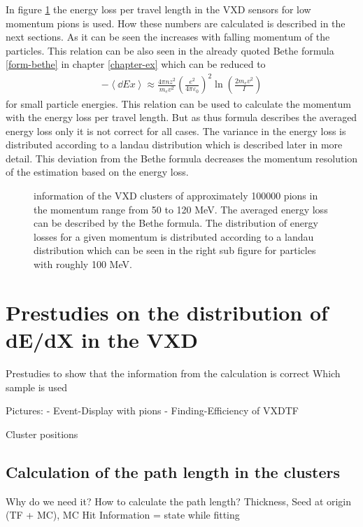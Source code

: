 In figure \ref{fig-dedx-over-p} the energy loss per travel length in the VXD sensors for low momentum pions is used. How these numbers are calculated is described in the next sections. As it can be seen the \dedx increases with falling momentum of the particles. This relation can be also seen in the already quoted Bethe formula \ref{form-bethe} in chapter \ref{chapter-ex} which can be reduced to 
\begin{align*}
 -\left \langle \dd{E}{x} \right\rangle \approx \frac{4 \pi n z^2}{m_e v^2} \left( \frac{e^2}{4 \pi \varepsilon_0} \right)^2 \ln \left( \frac{2 m_e v^2}{I} \right)
\end{align*} 
for small particle energies. This relation can be used to calculate the momentum with the energy loss per travel length. But as thus formula describes the averaged energy loss only it is not correct for all cases. The variance in the energy loss is distributed according to a landau distribution which is described later in more detail. This deviation from the Bethe formula decreases the momentum resolution of the estimation based on the energy loss.

\begin{figure}
 \caption{\dedx information of the VXD clusters of  approximately 100000 pions in the momentum range from 50 to 120 MeV. The averaged energy loss can be described by the Bethe formula. The distribution of energy losses for a given momentum is distributed according to a landau distribution which can be seen in the right sub figure for particles with roughly 100 MeV.}
 \label{fig-dedx-over-p}
\end{figure}


\section{Prestudies on the distribution of dE/dX in the VXD}



Prestudies to show that the information from the calculation is correct
Which sample is used


Pictures:
- Event-Display with pions
- Finding-Efficiency of VXDTF

Cluster positions

\subsection{Calculation of the path length in the clusters}
Why do we need it?
How to calculate the path length?
Thickness, Seed at origin (TF + MC), MC Hit Information = state while fitting

